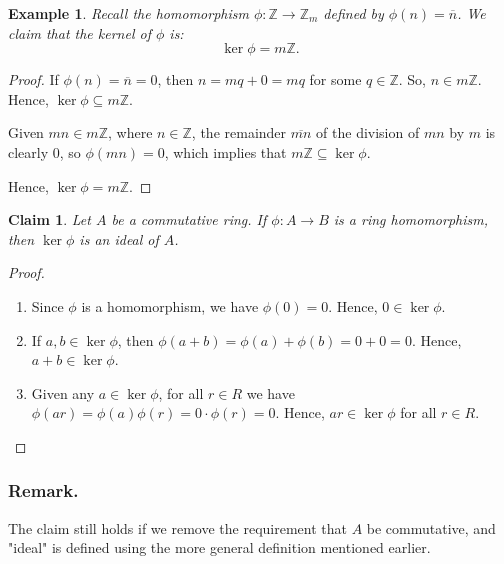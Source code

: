 \documentclass[a4paper,12pt]{report}
\newcommand{\ol}[1]{\overline{#1}}
\newcounter{statement}
\numberwithin{statement}{chapter}
\newtheorem{claim}[statement]{Claim}
\newtheorem{eg}[statement]{\bf Example}
\numberwithin{equation}{chapter}
\numberwithin{section}{chapter}
\numberwithin{subsection}{section}
\begin{document}
\begin{eg}
Recall the homomorphism $\phi : \mathbb{Z}\rightarrow \mathbb{Z}_m$ defined by $\phi(n) = \ol{n}$.
We claim that the kernel of $\phi$ is:
\[
\ker \phi = m\mathbb{Z}.
\]
\end{eg}
\begin{proof}

If $\phi(n) = \ol{n} = 0$, then $n = mq + 0 = mq$ for some $q \in \mathbb{Z}$.  So, $n \in m\mathbb{Z}$.
Hence, $\ker \phi \subseteq m\mathbb{Z}$.



Given $mn \in m\mathbb{Z}$, where $n \in \mathbb{Z}$, the remainder $\ol{mn}$ of the division of $mn$ by $m$
is clearly $0$, so $\phi(mn) = 0$, which implies that $m \mathbb{Z}\subseteq \ker \phi$.



Hence, $\ker \phi = m\mathbb{Z}$.

\end{proof}




\begin{claim}
Let $A$ be a commutative ring.
If $\phi : A \rightarrow B$ is a ring homomorphism, then $\ker \phi$ is an ideal of $A$.
\end{claim}
\begin{proof}

\begin{enumerate}
\item 
Since $\phi$ is a homomorphism, we have $\phi(0) = 0$.
Hence, $0 \in \ker \phi$.

\item 
If $a, b \in \ker \phi$, then $\phi(a + b) = \phi(a) + \phi(b) = 0 + 0 = 0$.
Hence, $a + b \in \ker \phi$.

\item 
Given any $a \in \ker \phi$, for all $r \in R$
we have $\phi(ar) = \phi(a)\phi(r) = 0\cdot \phi(r) = 0$.
Hence, $ar \in \ker \phi$ for all $r \in R$.
\end{enumerate}

\end{proof}




\subsubsection{Remark.}

The claim still holds if we remove the requirement that $A$ be commutative,
and "ideal" is defined using the more general definition mentioned earlier.
\end{document}
